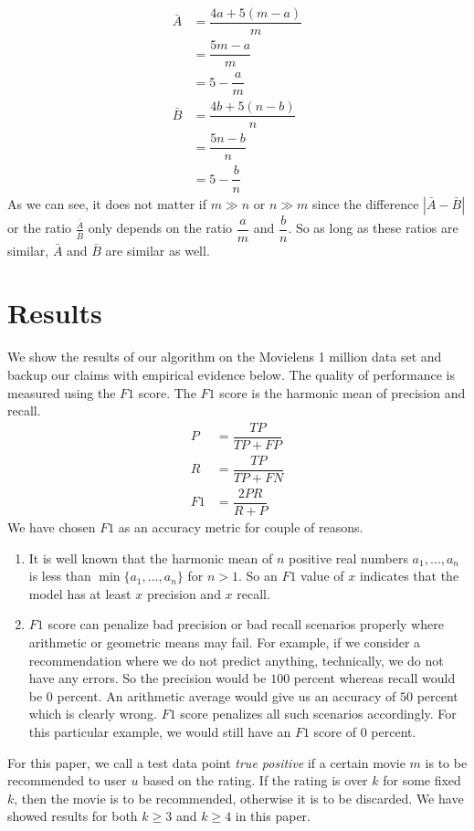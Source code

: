 \documentclass{article}
\begin{document}
\begin{enumerate}
				\begin{align*}
					\bar{A}
						& = \dfrac{4a+5(m-a)}{m}\\
						& = \dfrac{5m-a}{m}\\
						& = 5-\dfrac{a}{m}\\
					\bar{B}
						& = \dfrac{4b+5(n-b)}{n}\\
						& = \dfrac{5n-b}{n}\\
						& = 5-\dfrac{b}{n}
				\end{align*}
			As we can see, it does not matter if $m\gg n$ or $n\gg m$ since the difference $|\bar{A}-\bar{B}|$ or the ratio $\frac{\bar{A}}{\bar{B}}$ only depends on the ratio $\dfrac{a}{m}$ and $\dfrac{b}{n}$. So as long as these ratios are similar, $\bar{A}$ and $\bar{B}$ are similar as well.
		\end{enumerate}\clearpage
	\section{Results}
	We show the results of our algorithm on the Movielens 1 million data set and backup our claims with empirical evidence below. The quality of performance is measured using the $F1$ score. The $F1$ score is the harmonic mean of precision and recall.
		\begin{align*}
			P
				& = \dfrac{TP}{TP+FP}\\
			R
				& = \dfrac{TP}{TP+FN}\\
			F1
				& = \dfrac{2PR}{R+P}
		\end{align*}
	We have chosen $F1$ as an accuracy metric for couple of reasons.
		\begin{enumerate}
			\item It is well known that the harmonic mean of $n$ positive real numbers $a_{1},\ldots,a_{n}$ is less than $\min\{a_{1},\ldots,a_{n}\}$ for $n>1$. So an $F1$ value of $x$ indicates that the model has at least $x$ precision and $x$ recall.
			\item $F1$ score can penalize bad precision or bad recall scenarios properly where arithmetic or geometric means may fail. For example, if we consider a recommendation where we do not predict anything, technically, we do not have any errors. So the precision would be $100$ percent whereas recall would be $0$ percent. An arithmetic average would give us an accuracy of $50$ percent which is clearly wrong. $F1$ score penalizes all such scenarios accordingly. For this particular example, we would still have an $F1$ score of $0$ percent.
		\end{enumerate}
	For this paper, we call a test data point \textit{true positive} if a certain movie $m$ is to be recommended to user $u$ based on the rating. If the rating is over $k$ for some fixed $k$, then the movie is to be recommended, otherwise it is to be discarded. We have showed results for both $k\geq 3$ and $k\geq 4$ in this paper.
\end{document}
